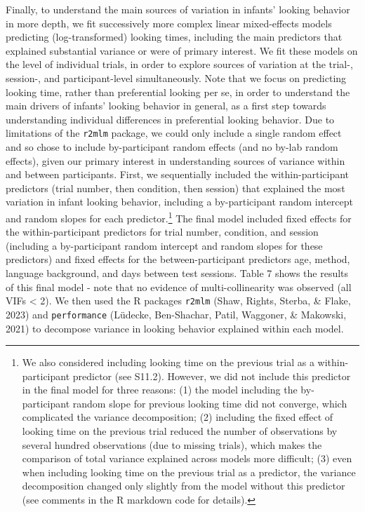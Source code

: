 \documentclass[
  man, donotrepeattitle,floatsintext]{apa6}
\begin{document}
Finally, to understand the main sources of variation in infants' looking behavior in more depth, we fit successively more complex linear mixed-effects models predicting (log-transformed) looking times, including the main predictors that explained substantial variance or were of primary interest.
We fit these models on the level of individual trials, in order to explore sources of variation at the trial-, session-, and participant-level simultaneously.
Note that we focus on predicting looking time, rather than preferential looking per se, in order to understand the main drivers of infants' looking behavior in general, as a first step towards understanding individual differences in preferential looking behavior.
Due to limitations of the \texttt{r2mlm} package, we could only include a single random effect and so chose to include by-participant random effects (and no by-lab random effects), given our primary interest in understanding sources of variance within and between participants.
First, we sequentially included the within-participant predictors (trial number, then condition, then session) that explained the most variation in infant looking behavior, including a by-participant random intercept and random slopes for each predictor.\footnote{We also considered including looking time on the previous trial as a within-participant predictor (see S11.2). However, we did not include this predictor in the final model for three reasons:
  (1) the model including the by-participant random slope for previous looking time did not converge, which complicated the variance decomposition; (2) including the fixed effect of looking time on the previous trial reduced the number of observations by several hundred observations (due to missing trials), which makes the comparison of total variance explained across models more difficult; (3) even when including looking time on the previous trial as a predictor, the variance decomposition changed only slightly from the model without this predictor (see comments in the R markdown code for details).}
The final model included fixed effects for the within-participant predictors for trial number, condition, and session (including a by-participant random intercept and random slopes for these predictors) and fixed effects for the between-participant predictors age, method, language background, and days between test sessions.
Table 7 shows the results of this final model - note that no evidence of multi-collinearity was observed (all VIFs \textless{} 2).
We then used the R packages \texttt{r2mlm} (Shaw, Rights, Sterba, \& Flake, 2023) and \texttt{performance} (Lüdecke, Ben-Shachar, Patil, Waggoner, \& Makowski, 2021) to decompose variance in looking behavior explained within each model.
\end{document}
